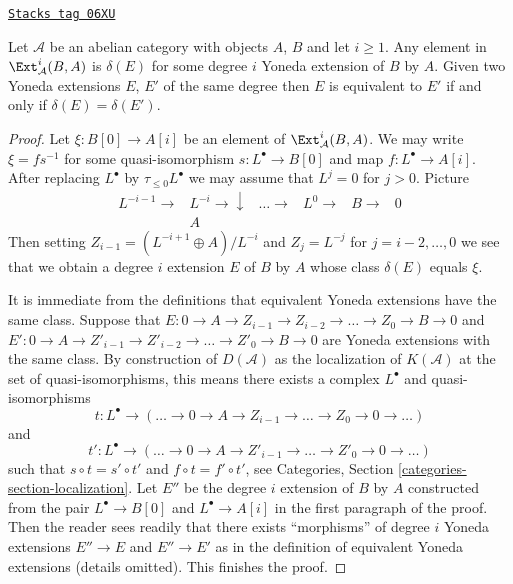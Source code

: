 \begin{lemma}
\label{derived-lemma-yoneda-extension}
\href{https://stacks.math.columbia.edu/tag/06XU}{\texttt{Stacks tag 06XU}}

Let $\mathcal{A}$ be an abelian category with objects $A$, $B$ and
let $i \geq 1$.
Any element in $\Ext^i_\mathcal{A}(B, A)$ is $\delta(E)$
for some degree $i$ Yoneda extension of $B$ by $A$.
Given two Yoneda extensions $E$, $E'$ of the same degree
then $E$ is equivalent to $E'$ if and only if $\delta(E) = \delta(E')$.
\end{lemma}

\begin{proof}
Let $\xi : B[0] \to A[i]$ be an element of $\Ext^i_\mathcal{A}(B, A)$.
We may write $\xi = f s^{-1}$ for some quasi-isomorphism
$s : L^\bullet \to B[0]$ and map $f : L^\bullet \to A[i]$.
After replacing $L^\bullet$ by $\tau_{\leq 0}L^\bullet$ we may assume
that $L^j = 0$ for $j > 0$. Picture
$$
\begin{array}{cccccc}L^{- i - 1} \longrightarrow & L^{-i} \longrightarrow\downarrow & \ldots \longrightarrow & L^0 \longrightarrow & B \longrightarrow & 0 \\  & A &  &  &  & \end{array}
$$
Then setting $Z_{i - 1} = (L^{- i + 1} \oplus A)/L^{-i}$ and
$Z_j = L^{-j}$ for $j = i - 2, \ldots, 0$ we see that we obtain a
degree $i$ extension $E$ of $B$ by $A$ whose class $\delta(E)$ equals
$\xi$.

\medskip\noindent
It is immediate from the definitions that equivalent Yoneda extensions
have the same class. Suppose that
$E : 0 \to A \to Z_{i - 1} \to Z_{i - 2} \to \ldots \to Z_0 \to B \to 0$ and
$E' : 0 \to A \to Z'_{i - 1} \to Z'_{i - 2} \to \ldots \to Z'_0 \to B \to 0$
are Yoneda extensions with the same class.
By construction of $D(\mathcal{A})$ as the localization
of $K(\mathcal{A})$ at the set of quasi-isomorphisms, this means there
exists a complex $L^\bullet$ and quasi-isomorphisms
$$
t : L^\bullet \to
(\ldots \to 0 \to A \to Z_{i - 1} \to \ldots \to Z_0 \to 0 \to \ldots)
$$
and
$$
t' : L^\bullet \to
(\ldots \to 0 \to A \to Z'_{i - 1} \to \ldots \to Z'_0 \to 0 \to \ldots)
$$
such that $s \circ t = s' \circ t'$ and $f \circ t = f' \circ t'$, see
Categories, Section \ref{categories-section-localization}.
Let $E''$ be the degree $i$ extension of $B$ by $A$ constructed from
the pair $L^\bullet \to B[0]$ and $L^\bullet \to A[i]$ in the first
paragraph of the proof. Then the reader sees readily that there exists
``morphisms'' of degree $i$ Yoneda extensions $E'' \to E$ and $E'' \to E'$
as in the definition of equivalent Yoneda extensions (details omitted).
This finishes the proof.
\end{proof}

